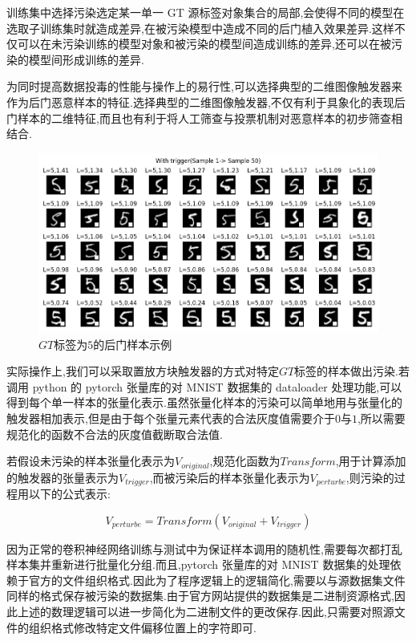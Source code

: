 训练集中选择污染选定某一单一 GT 源标签对象集合的局部,会使得不同的模型在选取子训练集时就造成差异,在被污染模型中造成不同的后门植入效果差异.这样不仅可以在未污染训练的模型对象和被污染的模型间造成训练的差异,还可以在被污染的模型间形成训练的差异.

为同时提高数据投毒的性能与操作上的易行性,可以选择典型的二维图像触发器来作为后门恶意样本的特征.选择典型的二维图像触发器,不仅有利于具象化的表现后门样本的二维特征,而且也有利于将人工筛查与投票机制对恶意样本的初步筛查相结合.

\begin{figure}
	\centering
	\includegraphics[scale=0.5]{Figures/withtrigger.png}
	\caption{$GT$标签为$5$的后门样本示例}
\end{figure}

实际操作上,我们可以采取置放方块触发器的方式对特定$GT$标签的样本做出污染.若调用 python 的 pytorch 张量库的对 MNIST 数据集的 dataloader 处理功能,可以得到每个单一样本的张量化表示.虽然张量化样本的污染可以简单地用与张量化的触发器相加表示,但是由于每个张量元素代表的合法灰度值需要介于$0$与$1$,所以需要规范化的函数不合法的灰度值截断取合法值.

若假设未污染的样本张量化表示为$V_{original}$,规范化函数为$Transform$,用于计算添加的触发器的张量表示为$V_{trigger}$,而被污染后的样本张量化表示为$V_{perturbe}$,则污染的过程用以下的公式表示:

\[
V_{perturbe}=Transform(V_{original}+V_{trigger}) \tag{1.3}
\]

因为正常的卷积神经网络训练与测试中为保证样本调用的随机性,需要每次都打乱样本集并重新进行批量化分组.而且,pytorch 张量库的对 MNIST 数据集的处理依赖于官方的文件组织格式.因此为了程序逻辑上的逻辑简化,需要以与源数据集文件同样的格式保存被污染的数据集.由于官方网站提供的数据集是二进制资源格式,因此上述的数理逻辑可以进一步简化为二进制文件的更改保存.因此,只需要对照源文件的组织格式修改特定文件偏移位置上的字符即可.

